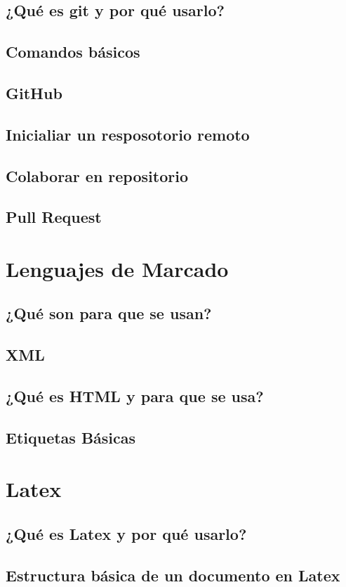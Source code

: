 \documentclass[11pt,letterpaper]{article}
\begin{document}
\subsection{¿Qué es git y por qué usarlo?}
\subsection{Comandos básicos}

\subsection{GitHub}
\subsection{Inicialiar un resposotorio remoto}
\subsection{Colaborar en repositorio}
\subsection{Pull Request}
\section{Lenguajes de Marcado}
\subsection{¿Qué son para que se usan?}
\subsection{XML}
\subsection{¿Qué es HTML y para que se usa?}
\subsection{Etiquetas Básicas}
\section{Latex}
\subsection{¿Qué es Latex y por qué usarlo?}
\subsection{Estructura básica de un documento en Latex}
\end{document}
